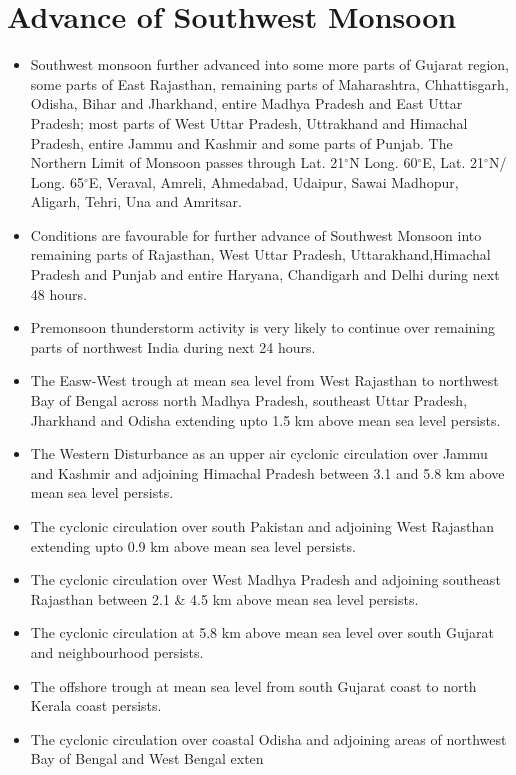 \documentclass[10pt,a4paper]{article} %
\begin{document}
\section{Advance of Southwest Monsoon}
\begin{multicols}{2} %
\begin{itemize}
\item Southwest monsoon further advanced into some more parts of Gujarat region, some parts of East Rajasthan,
remaining parts of Maharashtra, Chhattisgarh, Odisha, Bihar and Jharkhand, entire Madhya Pradesh and East Uttar Pradesh;
most parts of West Uttar Pradesh, Uttrakhand and Himachal Pradesh, entire Jammu and Kashmir and some parts of Punjab. The Northern Limit of Monsoon passes through Lat. 21$^\circ$N Long. 60$^\circ$E, Lat. 21$^\circ$N/ Long. 65$^\circ$E, Veraval, Amreli, Ahmedabad, Udaipur, Sawai Madhopur, Aligarh, Tehri, Una and Amritsar.

\item Conditions are favourable for further advance of Southwest Monsoon into remaining parts of Rajasthan, West Uttar Pradesh,
Uttarakhand,Himachal Pradesh and Punjab and entire Haryana, Chandigarh and Delhi during next 48 hours.

\item Premonsoon thunderstorm activity is very likely to continue over remaining parts of northwest
India during next 24 hours.

\item The Easw-West trough at mean sea level from West Rajasthan to northwest Bay of Bengal across north Madhya Pradesh,
southeast Uttar Pradesh, Jharkhand and Odisha extending upto 1.5 km above mean sea level persists.

\item The Western Disturbance as an upper air cyclonic circulation over Jammu and Kashmir and adjoining Himachal Pradesh between 3.1 and 5.8 km above mean sea level persists. 

\item The cyclonic circulation over south Pakistan and adjoining West Rajasthan extending upto 0.9 km above mean sea level persists.

\item The cyclonic circulation over West Madhya Pradesh and adjoining southeast Rajasthan between 2.1 \& 4.5 km above mean sea
level persists.

\item The cyclonic circulation at 5.8 km above mean sea level over south Gujarat and neighbourhood persists.

\item The offshore trough at mean sea level from south Gujarat coast to north Kerala coast persists.

\item The cyclonic circulation over coastal Odisha and adjoining areas of northwest Bay of Bengal and West Bengal exten
\end{itemize}

\end{multicols}
\end{document}
